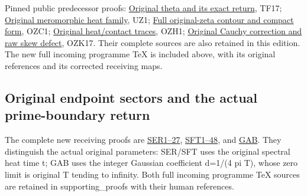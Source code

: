 \documentclass[
  10pt,
  a4paper,
]{article}
\begin{document}
Pinned public predecessor proofs:
\href{https://github.com/KokunoYumeto/zeta-function-research-reader/blob/a8e35be8f238913ae5bcbd8ad55a07d539b350f3/workbenches/splitzero-tandem/branches/tau-zero-prime-positivity/FAITHFUL_THETA_COMPLETION_RETURN.md\#L149}{Original
theta and its exact return}, TF17;
\href{https://github.com/KokunoYumeto/zeta-function-research-reader/blob/a8e35be8f238913ae5bcbd8ad55a07d539b350f3/workbenches/splitzero-tandem/branches/tau-zero-prime-positivity/FAITHFUL_UNCOMPLETED_ZETA_HEAT.md\#L20}{Original
meromorphic heat family}, UZ1;
\href{https://github.com/KokunoYumeto/zeta-function-research-reader/blob/a8e35be8f238913ae5bcbd8ad55a07d539b350f3/workbenches/splitzero-tandem/branches/tau-zero-prime-positivity/ORIGINAL_ZETA_COMPACT_WEIL_RECONSTRUCTION.md\#L15}{Full
original-zeta contour and compact form}, OZC1;
\href{https://github.com/KokunoYumeto/zeta-function-research-reader/blob/a8e35be8f238913ae5bcbd8ad55a07d539b350f3/workbenches/splitzero-tandem/branches/tau-zero-prime-positivity/ORIGINAL_ZETA_HEAT_CONTACT_RECONSTRUCTION.md\#L17}{Original
heat/contact traces}, OZH1;
\href{https://github.com/KokunoYumeto/zeta-function-research-reader/blob/a8e35be8f238913ae5bcbd8ad55a07d539b350f3/workbenches/splitzero-tandem/branches/tau-zero-prime-positivity/ORIGINAL_ZETA_CAUCHY_RECONSTRUCTION.md\#L184}{Original
Cauchy correction and raw skew defect}, OZK17. Their complete sources
are also retained in this edition. The new full incoming programme TeX
is included above, with its original references and its corrected
receiving maps.

\subsection{Original endpoint sectors and the actual prime-boundary
return}\label{original-endpoint-sectors-and-the-actual-prime-boundary-return}

The complete new receiving proofs are
\href{SECTORIAL_ENDPOINT_ZERO_TRACE_RETURN.md}{SER1--27},
\href{SECTORIAL_FILTER_TRACE_DERIVATION.md}{SFT1--48}, and
\href{GAUSSIAN_ARITHMETIC_BOUNDARY_RETURN.md}{GAB}. They distinguish the
actual original parameters: SER/SFT uses the original spectral heat time
t; GAB uses the integer Gaussian coefficient d=1/(4 pi T), whose zero
limit is original T tending to infinity. Both full incoming programme
TeX sources are retained in supporting\_proofs with their human
references.
\end{document}
